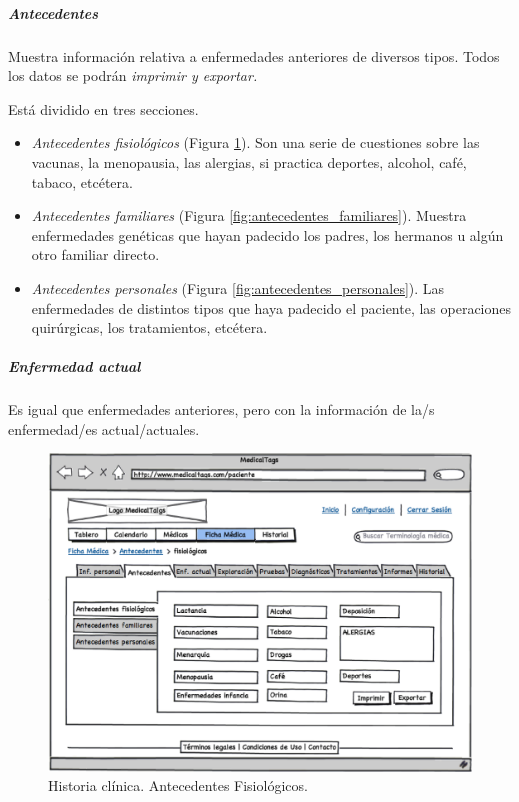 \documentclass[a4paper,oneside,11pt]{book}
\begin{document}
		\subparagraph{Antecedentes} %
		\label{par:antecedentes}
		
			Muestra información relativa a enfermedades anteriores de diversos tipos. Todos los datos se podrán \textit{imprimir y exportar.}
			
			
			Está dividido en tres secciones.
			
			\begin{itemize}
				\item \textit{Antecedentes fisiológicos} (Figura \ref{fig:antecedentes_fisiologicos}). Son una serie de cuestiones sobre las vacunas, la menopausia, las alergias, si practica deportes, alcohol, café, tabaco, etcétera.
				\item \textit{Antecedentes familiares} (Figura \ref{fig:antecedentes_familiares}). Muestra enfermedades genéticas que hayan padecido los padres, los hermanos u algún otro familiar directo. 
				
				
				\item \textit{Antecedentes personales} (Figura \ref{fig:antecedentes_personales}). Las enfermedades de distintos tipos que haya padecido el paciente, las operaciones quirúrgicas, los tratamientos, etcétera. 
			\end{itemize}
			
			\subparagraph{Enfermedad actual} %
			\label{par:enfermedad_actual}
				Es igual que enfermedades anteriores, pero con la información de la/s enfermedad/es actual/actuales.
			
			\begin{figure}[H]
			  \centering
			    \includegraphics[width=12cm]{img/eps/30_Antecedentes_pacientes.eps}
			  \caption{Historia clínica. Antecedentes Fisiológicos.}
			  \label{fig:antecedentes_fisiologicos}
			\end{figure}
			
\end{document}

